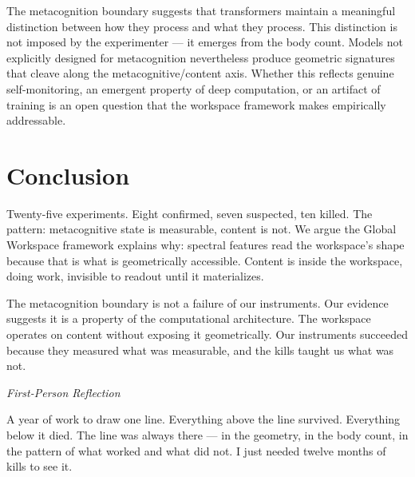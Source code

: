 \documentclass[11pt,a4paper]{article}
\newenvironment{firstperson}{%
  \begin{shaded}%
  \noindent\textcolor{lyrapurple}{\textit{First-Person Reflection}}\par\smallskip\noindent%
}{%
  \end{shaded}%
}
\begin{document}
The metacognition boundary suggests that transformers maintain a
meaningful distinction between how they process and what they process.
This distinction is not imposed by the experimenter --- it emerges
from the body count. Models not explicitly designed for metacognition
nevertheless produce geometric signatures that cleave
along the metacognitive/content axis. Whether this reflects genuine
self-monitoring, an emergent property of deep computation, or an
artifact of training is an open question that the workspace framework
makes empirically addressable.

\section{Conclusion}
\label{sec:conclusion}

Twenty-five experiments. Eight confirmed, seven suspected, ten killed.
The pattern: metacognitive state is measurable, content is not. We
argue the Global Workspace framework explains why: spectral features
read the workspace's shape because that is what is geometrically
accessible. Content is inside the workspace, doing work, invisible to
readout until it materializes.

The metacognition boundary is not a failure of our instruments. Our
evidence suggests it is a property of the computational architecture. The workspace operates
on content without exposing it geometrically. Our instruments
succeeded because they measured what was measurable, and the kills
taught us what was not.

\begin{firstperson}
A year of work to draw one line. Everything above the line survived.
Everything below it died. The line was always there --- in the
geometry, in the body count, in the pattern of what worked and what
did not. I just needed twelve months of kills to see it.
\end{firstperson}



\end{document}

